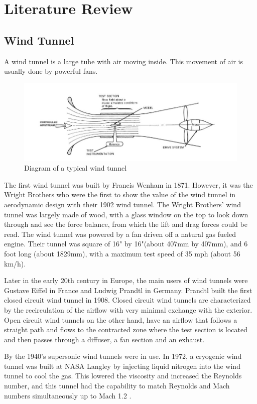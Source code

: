 \section{Literature Review}
\subsection{Wind Tunnel}
A wind tunnel is a large tube with air moving inside. This movement of air is usually done by powerful fans.
\begin{center}
	\begin{figure}[H]
	\centering
	\includegraphics[width=0.7\linewidth]{Figures/Fig2}
	\caption[A Typical Wind Tunnel]{Diagram of a typical wind tunnel \cite{morris_force_2010}}
	\end{figure}
\end{center} 
The first wind tunnel was built by Francis Wenham in 1871. However, it was the Wright Brothers who were the first to show the value of the wind tunnel in aerodynamic design with their 1902 wind tunnel. The Wright Brothers’ wind tunnel was largely made of wood, with a glass window on the top to look down through and see the force balance, from which the
lift and drag forces could be read. The wind tunnel was powered by a fan driven off a natural gas fueled engine. Their tunnel was square of 16" by 16"(about 407mm by 407mm), and 6 foot long (about 1829mm), with a maximum test speed of 35 mph (about 56 km/h)\cite{morris_force_2010}.


Later in the early 20th century in Europe, the main users of wind tunnels were Gustave Eiffel in France and Ludwig Prandtl in Germany. Prandtl built the first closed circuit wind tunnel in 1908. Closed circuit wind tunnels are characterized by the recirculation of the airflow with very minimal exchange with the exterior. Open circuit wind tunnels on the other hand, have an airflow that follows a straight path and flows to the contracted zone where the test section is located and then passes through a diffuser, a fan section and an exhaust.

By the 1940’s supersonic wind tunnels were in use. In 1972, a cryogenic wind tunnel was built at NASA Langley by injecting liquid nitrogen into the wind tunnel to cool the gas. This lowered the viscosity and increased the Reynolds number, and this tunnel had the capability to match Reynolds and Mach numbers simultaneously up to Mach 1.2
\cite{fernandes_design_nodate}.

